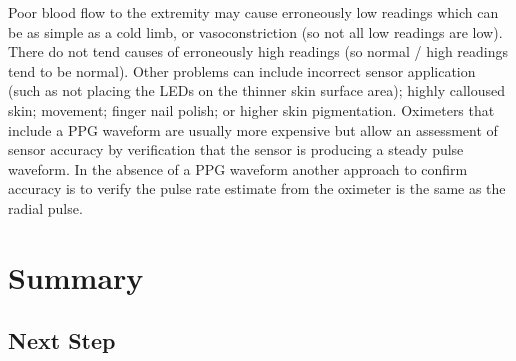 Poor blood flow to the extremity may cause erroneously low readings which can be as simple as a cold limb, or vasoconstriction (so not all low readings are low). There do not tend causes of erroneously high readings (so normal / high readings tend to be normal). Other problems can include incorrect sensor application (such as not placing the LEDs on the thinner skin surface area); highly calloused skin; movement; finger nail polish; or higher skin pigmentation. Oximeters that include a PPG waveform are usually more expensive but allow an assessment of sensor accuracy by verification that the sensor is producing a steady pulse waveform. In the absence of a PPG waveform another approach to confirm accuracy is to verify the pulse rate estimate from the oximeter is the same as the radial pulse.

\section{Summary}



\subsection{Next Step}



\printbibliography[heading=subbibintoc]